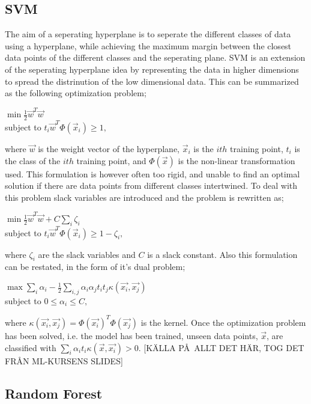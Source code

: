 \documentclass{article}
\begin{document}
\subsection{SVM}
The aim of a seperating hyperplane is to seperate the different classes of data using a hyperplane, while achieving the maximum margin between the closest data points of the different classes and the seperating plane. SVM is an extension of the seperating hyperplane idea by representing the data in higher dimensions to spread the distrinution of the low dimensional data. This can be summarized as the following optimization problem;
\begin{center}
$\min \frac{1}{2}\vec{w}^{T}\vec{w}$ \\
subject to $t_i \vec{w}^{T} \Phi(\vec{x}_i)  \geq 1, $
\end{center}
where $\vec{w}$ is the weight vector of the hyperplane, $\vec{x}_i$ is the $ith$ training point, $t_i$ is the class of the $ith$ training point, and $\Phi(\vec{x})$ is the non-linear transformation used. This formulation is however often too rigid, and unable to find an optimal solution if there are data points from different classes intertwined. To deal with this problem slack variables are introduced and the problem is rewritten as;
\begin{center}
$\min \frac{1}{2}\vec{w}^{T}\vec{w} + C\sum\limits_i \zeta_i $ \\
subject to $t_i \vec{w}^{T} \Phi(\vec{x}_i)  \geq 1 - \zeta_i, $
\end{center}
where $\zeta_i$ are the slack variables and $C$ is a slack constant. Also this formulation can be restated, in the form of it's dual problem;

\begin{center}
$\max \sum\limits_i \alpha_i - \frac{1}{2}\sum\limits_{i,j} \alpha_i \alpha_j t_i t_j \kappa (\vec{x_i}, \vec{x_j})$ \\
subject to $0 \leq \alpha_i \leq C, $
\end{center}
where $\kappa (\vec{x_i}, \vec{x_j}) = \Phi(\vec{x_i})^T \Phi(\vec{x_j})$ is the kernel. Once the optimization problem has been solved, i.e. the model has been trained, unseen data points, $\vec{x}$,  are classified with $\sum\limits_i \alpha_i t_i \kappa(\vec{x},\vec{x_i}) > 0$. [K\"ALLA P\AA\ ALLT DET H\"AR, TOG DET FR\AA N ML-KURSENS SLIDES]


\subsection{Random Forest}
\end{document}

